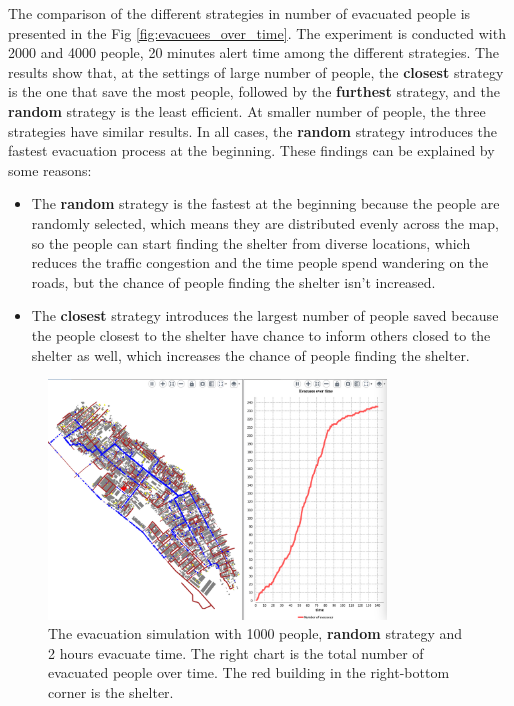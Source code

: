 \documentclass[12pt]{article}
\begin{document}
The comparison of the different strategies in number of evacuated people is presented in the Fig \ref{fig:evacuees_over_time}. The experiment is conducted with 2000 and 4000 people, 20 minutes alert time among the different strategies. The results show that, at the settings of large number of people, the \textbf{closest} strategy is the one that save the most people, followed by the \textbf{furthest} strategy, and the \textbf{random} strategy is the least efficient. At smaller number of people, the three strategies have similar results. In all cases, the \textbf{random} strategy introduces the fastest evacuation process at the beginning. These findings can be explained by some reasons:
\begin{itemize}
    \item The \textbf{random} strategy is the fastest at the beginning because the people are randomly selected, which means they are distributed evenly across the map, so the people can start finding the shelter from diverse locations, which reduces the traffic congestion and the time people spend wandering on the roads, but the chance of people finding the shelter isn't increased.
    \item The \textbf{closest} strategy introduces the largest number of people saved because the people closest to the shelter have chance to inform others closed to the shelter as well, which increases the chance of people finding the shelter.
\end{itemize}

\begin{figure}
    \centering
    \includegraphics[width=0.8\textwidth]{../images/single-simulation.png}
    \caption{The evacuation simulation with 1000 people, \textbf{random} strategy and 2 hours evacuate time. The right chart is the total number of evacuated people over time. The red building in the right-bottom corner is the shelter.}
    \label{fig:results-single}
\end{figure}
\end{document}
